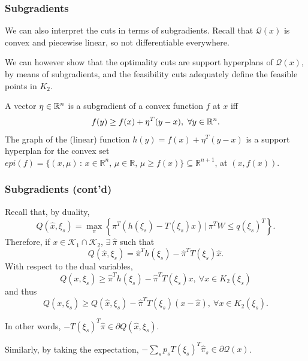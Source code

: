 \documentclass{beamer}
\def\cK{\mathcal{K}}
\begin{document}



\begin{frame}
\frametitle{Subgradients}

We can also interpret the cuts in terms of subgradients.
Recall that $\mathcal{Q}(x)$ is convex and piecewise linear, so not differentiable everywhere.
	
\mbox{}
	
We can however show that the optimality cuts are support hyperplans of $\mathcal{Q}(x)$, by means of subgradients, and the feasibility cuts adequately define the feasible points in $K_2$.

\mbox{}
	
A vector $\eta \in {\mathbb{R}}^n$ is a {\red subgradient} of a convex function $f$ at $x$ iff
\[ f(y) \geq f(x) + \eta^T(y-x),\ \forall y \in {\mathbb{R}}^n.\]
The graph of the (linear) function $h(y) = f(x) + \eta^T(y-x)$ is a support hyperplan for the convex set $epi(f) = \{ (x, \mu) \, : \, x \in \mathbb{R}^n,\, \mu \in \mathbb{R},\, \mu \ge f(x) \} \subseteq \mathbb{R}^{n+1}$, at $(x, f(x))$.
	
\end{frame}

\begin{frame}
\frametitle{Subgradients (cont'd)}

Recall that, by duality,
\[
Q(\hat{x}, \xi_s) =
\max_{\pi} \left\lbrace \pi^T(h(\xi_s)-T(\xi_s)x) \,|\, \pi^TW \leq q(\xi_s)^T \right\rbrace.
\]
Therefore, if $x \in \cK_1 \cap \cK_2$, $\exists\ \hat{\pi}$ such that
\[
Q(\hat{x}, \xi_s) = \hat{\pi}^Th(\xi_s)-\hat{\pi}^TT(\xi_s)\hat{x}.
\]
With respect to the dual variables,
\[
Q(x, \xi_s) \geq \hat{\pi}^Th(\xi_s)-\hat{\pi}^TT(\xi_s) x,
\ \forall x \in K_2(\xi_s)
\]
and thus
\[
Q(x, \xi_s) \geq Q({\hat{x}, \xi_s}) - \hat{\pi}^TT(\xi_s) (x-\hat{x}),
\ \forall x \in K_2(\xi_s).
\]
	
In other words, $-T(\xi_s)^T\hat{\pi} \in \partial Q(\hat{x}, \xi_s)$.
	
\mbox{}
	
Similarly, by taking the expectation, $- \sum_s p_s T(\xi_s)^T\hat{\pi}_s \in \partial \mathcal{Q}(x)$.
	
\end{frame}
\end{document}
